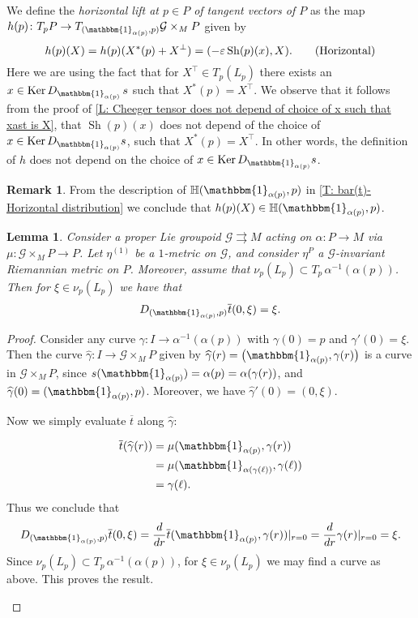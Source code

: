 \documentclass[12pt,a4paper,reqno]{amsart}
\DeclareMathOperator{\kernel}{Ker}
\DeclareMathOperator{\Sh}{Sh} %
\newcommand{\1}{\mathbbm{1}} %
\newcommand{\G}{\mathcal{G}} %
\newcommand{\Hor}{\mathbb{H}} %
\newtheorem{lemma}[thm]{Lemma}
\theoremstyle{definition}
\newtheorem{remark}[thm]{Remark}
\theoremstyle{TheoremNum}
\begin{document}
We define the \emph{horizontal lift at $p\in P$ of tangent vectors of $P$} as the map $h(p)\colon T_p P \to T_{(\1_{\alpha(p)},p)}\G\times_M P$ given by
\begin{equation}
h(p)(X) = h(p)(X^\ast(p)+X^\perp) = (-\varepsilon\Sh(p)(x), X).\tag{\mbox{Horizontal}}\label{E: Horizontal lifts of TGXP->P at 1(P)}
\end{equation}
Here we are using the fact that for $X^\top\in T_p(L_p)$ there exists an $x\in \kernel D_{\1_{\alpha(p)}}\, s$ such that $X^\ast(p) = X^\top$. We observe that it follows from the proof of \th\ref{L: Cheeger tensor does not depend of choice of x such that xast is X}, that $\Sh(p)(x)$ does not depend of the choice of $x\in \kernel D_{\1_{\alpha(p)}} s$, such that $X^\ast(p) = X^\top$. In other words, the definition of $h$ does not depend on the choice of $x\in \kernel D_{\1_{\alpha(p)}} s$.

\begin{remark}
From the description of $\Hor(\1_{\alpha(p)},p)$ in \th\ref{T: bar(t)-Horizontal distribution} we conclude that $h(p)(X)\in \Hor(\1_{\alpha(p)},p)$.
\end{remark}

\begin{lemma}\th\label{L: target map of groupoid action is the identity on the normal part of the orbits}
Consider a proper Lie groupoid  $\G\rightrightarrows M$ acting  on $\alpha\colon P\to M$ via $\mu\colon \G\times_M P \to P$. Let $\eta^{(1)}$ be a $1$-metric  on $\G$, and consider $\eta^P$ a $\G$-invariant Riemannian metric on $P$. Moreover, assume that $\nu_p(L_p)\subset T_p\, \alpha^{-1}(\alpha(p))$. Then for $\xi\in \nu_p (L_p)$ we have that 
\[
D_{(\1_{\alpha(p)},p)}\overline{t}(0,\xi) = \xi.
\]
\end{lemma}

\begin{proof}
Consider any curve  $\gamma\colon I\to \alpha^{-1}(\alpha(p))$   with $\gamma(0) = p$ and $\gamma'(0)= \xi$. Then the curve $\widehat{\gamma}\colon I\to \G\times_M P$ given by $\widehat{\gamma}(r) = \big(\1_{\alpha(p)},\gamma(r)\big)$ is a curve in $\G\times_M P$, since $s(\1_{\alpha(p)}) =\alpha(p)= \alpha(\gamma(r))$, and $\widehat{\gamma}(0) = (\1_{\alpha(p)},p)$. Moreover, we have $\widehat{\gamma}'(0) =(0,\xi)$.

Now we simply evaluate $\overline{t}$ along $\widehat{\gamma}$:
\begin{linenomath}
\begin{align*}
\overline{t}(\widehat{\gamma}(r)) &= \mu(\1_{\alpha(p)},\gamma(r))\\
&= \mu(\1_{\alpha(\gamma(\ell))},\gamma(\ell))\\
&= \gamma(\ell).
\end{align*}
Thus we conclude that 
\[
D_{(\1_{\alpha(p)},p)}\overline{t}(0,\xi) = \frac{d}{dr} \overline{t}(\1_{\alpha(p)},\gamma(r))|_{r=0}= \frac{d}{dr} \gamma(r)|_{r=0} = \xi.
\]
Since $\nu_p (L_p)\subset T_p\, \alpha^{-1}(\alpha(p))$, for $\xi\in \nu_p (L_p)$ we may find a curve as above. This proves the result.
\end{linenomath}
\end{proof}
\end{document}
